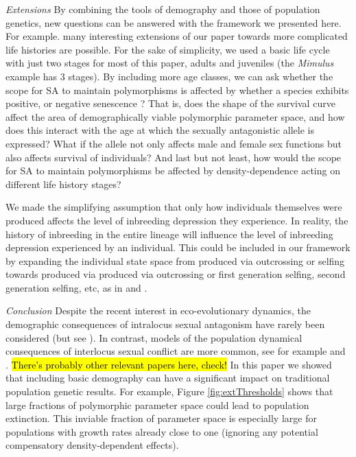 \documentclass[11pt]{article}
\begin{document}
\textit{Extensions} \newline
By combining the tools of demography and those of population genetics, new questions can be answered with the framework we presented here. For example. many interesting extensions of our paper towards more complicated life histories are possible. For the sake of simplicity, we used a basic life cycle with just two stages for most of this paper, adults and juveniles (the \textit{Mimulus} example has 3 stages). By including more age classes, we can ask whether the scope for SA to maintain polymorphisms is affected by whether a species exhibits positive, or negative senescence \citep{jones2014diversity}? That is, does the shape of the survival curve affect the area of demographically viable polymorphic parameter space, and how does this interact with the age at which the sexually antagonistic allele is expressed? What if the allele not only affects male and female sex functions but also affects survival of individuals? And last but not least, how would the scope for SA to maintain polymorphisms be affected by density-dependence acting on different life history stages? 

We made the simplifying assumption that only how individuals themselves were produced affects the level of inbreeding depression they experience. In reality, the history of inbreeding in the entire lineage will influence the level of inbreeding depression experienced by an individual. This could be included in our framework by expanding the individual state space from produced via outcrossing or selfing towards produced via produced via outcrossing or first generation selfing, second generation selfing, etc, as in \cite{kelly1999response} and \cite{kelly2007mutation}. 


\textit{Conclusion} \newline
Despite the recent interest in eco-evolutionary dynamics, the demographic consequences of intralocus sexual antagonism have rarely been considered (but see \cite{harts2014demography}). In contrast, models of the population dynamical consequences of interlocus sexual conflict are more common, see for example \cite{tanaka1996sexual} and \cite{martinez2017sexual}. \hl{There's probably other relevant papers here, check!} In this paper we showed that including basic demography can have a significant impact on traditional population genetic results. For example,  Figure \ref{fig:extThresholds} shows that large fractions of polymorphic parameter space could lead to population extinction. This inviable fraction of parameter space is especially large for populations with growth rates already close to one (ignoring any potential compensatory density-dependent effects). 
\end{document}
